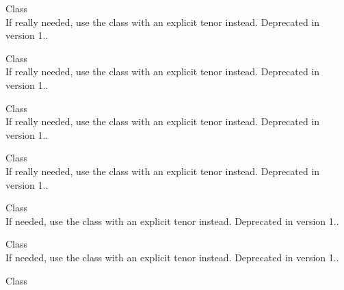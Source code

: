 \begin{DoxyRefList}
\item[Class \doxylink{class_quant_lib_1_1_euribor10_m}{Quant\+Lib\+::Euribor10M} ]\hfill \\
\label{deprecated__deprecated000059}%
%
If really needed, use the  class with an explicit tenor instead. Deprecated in version 1..  
\item[Class \doxylink{class_quant_lib_1_1_euribor11_m}{Quant\+Lib\+::Euribor11M} ]\hfill \\
\label{deprecated__deprecated000060}%
%
If really needed, use the  class with an explicit tenor instead. Deprecated in version 1..  
\item[Class \doxylink{class_quant_lib_1_1_euribor2_m}{Quant\+Lib\+::Euribor2M} ]\hfill \\
\label{deprecated__deprecated000053}%
%
If really needed, use the  class with an explicit tenor instead. Deprecated in version 1..  
\item[Class \doxylink{class_quant_lib_1_1_euribor2_w}{Quant\+Lib\+::Euribor2W} ]\hfill \\
\label{deprecated__deprecated000051}%
%
If really needed, use the  class with an explicit tenor instead. Deprecated in version 1..  
\item[Class \doxylink{class_quant_lib_1_1_euribor365__10_m}{Quant\+Lib\+::Euribor365\+\_\+10M} ]\hfill \\
\label{deprecated__deprecated000073}%
%
If needed, use the  class with an explicit tenor instead. Deprecated in version 1..  
\item[Class \doxylink{class_quant_lib_1_1_euribor365__11_m}{Quant\+Lib\+::Euribor365\+\_\+11M} ]\hfill \\
\label{deprecated__deprecated000074}%
%
If needed, use the  class with an explicit tenor instead. Deprecated in version 1..  
\item[Class \doxylink{class_quant_lib_1_1_euribor365__1_m}{Quant\+Lib\+::Euribor365\+\_\+1M} ]\hfill \\
\label{deprecated__deprecated000064}%

\end{DoxyRefList}
